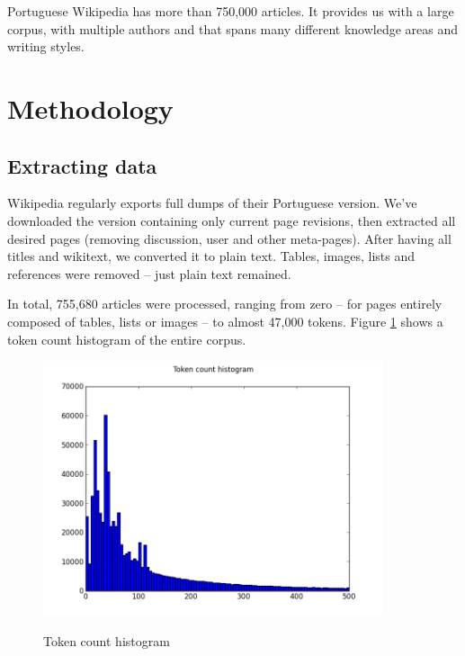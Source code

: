 \documentclass[11pt,a4paper]{article}
\begin{document}
Portuguese Wikipedia has more than 750,000 articles. It provides us with a
large corpus, with multiple authors and that spans many different knowledge
areas and writing styles.


\section{Methodology}

\subsection{Extracting data}

Wikipedia regularly exports full dumps of their Portuguese version. We've
downloaded the version containing only current page revisions, then extracted
all desired pages (removing discussion, user and other meta-pages).
After having all titles and wikitext, we converted it to plain text. Tables,
images, lists and references were removed -- just plain text remained.

In total, 755,680 articles were processed, ranging from zero -- for pages
entirely composed of tables, lists or images -- to almost 47,000 tokens. Figure
\ref{fig:token_histogram} shows a token count histogram of the entire corpus.


\begin{figure}[h]
\centerline{\includegraphics[width=10cm]{token_count_histogram.png}}
{\bf \caption{Token count histogram}
\label{fig:token_histogram}}
\end{figure}
\end{document}
